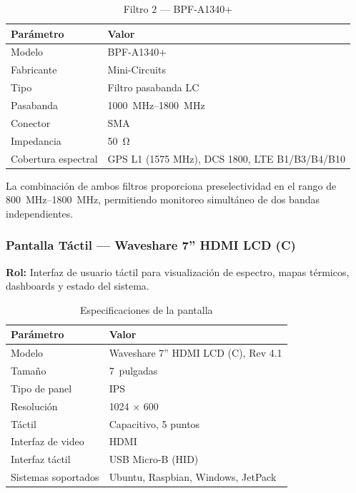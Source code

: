 \documentclass[12pt,a4paper]{article}
\begin{document}
\begin{table}[H]
\centering
\caption{Filtro 2 --- BPF-A1340+}
\begin{tabular}{@{}ll@{}}
\toprule
\textbf{Parámetro} & \textbf{Valor} \\
\midrule
Modelo & BPF-A1340+ \\
Fabricante & Mini-Circuits \\
Tipo & Filtro pasabanda LC \\
Pasabanda & \qtyrange{1000}{1800}{\MHz} \\
Conector & SMA \\
Impedancia & \qty{50}{\ohm} \\
Cobertura espectral & GPS L1 (1575 MHz), DCS 1800, LTE B1/B3/B4/B10 \\
\bottomrule
\end{tabular}
\end{table}

La combinación de ambos filtros proporciona preselectividad en el rango de \qtyrange{800}{1800}{\MHz}, permitiendo monitoreo simultáneo de dos bandas independientes.

\subsubsection{Pantalla Táctil --- Waveshare 7'' HDMI LCD (C)}

\textbf{Rol:} Interfaz de usuario táctil para visualización de espectro, mapas térmicos, dashboards y estado del sistema.

\begin{table}[H]
\centering
\caption{Especificaciones de la pantalla}
\begin{tabular}{@{}ll@{}}
\toprule
\textbf{Parámetro} & \textbf{Valor} \\
\midrule
Modelo & Waveshare 7'' HDMI LCD (C), Rev 4.1 \\
Tamaño & 7~pulgadas \\
Tipo de panel & IPS \\
Resolución & 1024 $\times$ 600 \\
Táctil & Capacitivo, 5 puntos \\
Interfaz de video & HDMI \\
Interfaz táctil & USB Micro-B (HID) \\
Sistemas soportados & Ubuntu, Raspbian, Windows, JetPack \\
\bottomrule
\end{tabular}
\end{table}
\end{document}
